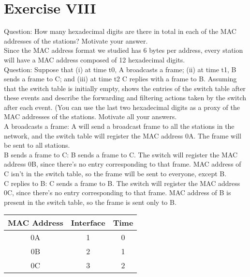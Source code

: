 \documentclass[11pt]{article}
\begin{document}
	\section*{Exercise VIII}
	Question:
	How many hexadecimal digits are there in total in each of the MAC addresses of the stations? Motivate your answer.\\
	Since the MAC address format we studied has 6 bytes per address, every station will have a MAC address composed of 12 hexadecimal digits.\\
	Question:
	Suppose that (i) at time t0, A broadcasts a frame; (ii) at time t1, B sends a frame to C; and (iii) at time t2 C replies with a frame to B. Assuming that the switch table is initially empty, shows the entries of the switch table after these events and describe the forwarding and filtering actions taken by the switch after each event. (You can use the last two hexadecimal digits as a proxy of the MAC addresses of the stations. Motivate all your answers.\\
	A broadcasts a frame: A will send a broadcast frame to all the stations in the network, and the switch table will register the MAC address 0A. The frame will be sent to all stations.\\
	B sends a frame to C: B sends a frame to C. The switch will register the MAC address 0B, since there's no entry corresponding to that frame. MAC address of C isn't in the switch table, so the frame will be sent to everyone, except B.\\
	C replies to B: C sends a frame to B. The switch will register the MAC address 0C, since there's no entry corresponding to that frame. MAC address of B is present in the switch table, so the frame is sent only to B.
	\begin{center}
    \begin{tabular}{|c c c|}
    \hline
    MAC Address & Interface & Time \\ [0.5ex]
    \hline\hline
    0A & 1 & 0 \\
     \hline
    0B & 2 & 1 \\
     \hline
    0C & 3 & 2 \\
     \hline
    \end{tabular}
    \end{center}
\end{document}
